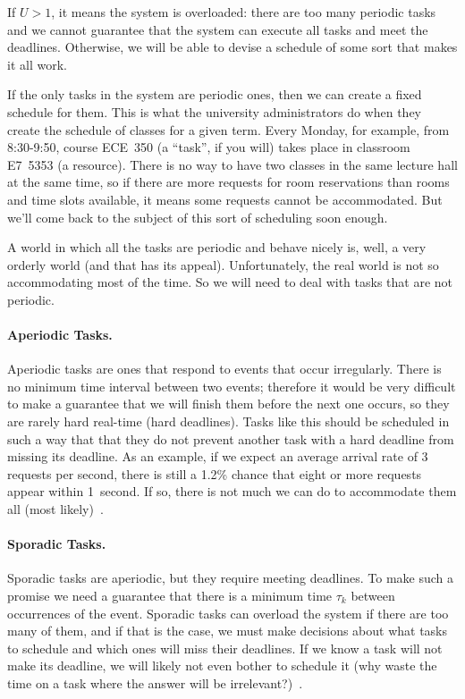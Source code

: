 If $U > 1$, it means the system is overloaded: there are too many periodic tasks and we cannot guarantee that the system can execute all tasks and meet the deadlines. Otherwise, we will be able to devise a schedule of some sort that makes it all work.

If the only tasks in the system are periodic ones, then we can create a fixed schedule for them. This is what the university administrators do when they create the schedule of classes for a given term. Every Monday, for example, from 8:30-9:50, course ECE~350 (a ``task'', if you will) takes place in classroom E7~5353 (a resource). There is no way to have two classes in the same lecture hall at the same time, so if there are more requests for room reservations than rooms and time slots available, it means some requests cannot be accommodated. But we'll come back to the subject of this sort of scheduling soon enough.

A world in which all the tasks are periodic and behave nicely is, well, a very orderly world (and that has its appeal). Unfortunately, the real world is not so accommodating most of the time. So we will need to deal with tasks that are not periodic.

\paragraph{Aperiodic Tasks.}
Aperiodic tasks are ones that respond to events that occur irregularly. There is no minimum time interval between two events; therefore it would be very difficult to make a guarantee that we will finish them before the next one occurs, so they are rarely hard real-time (hard deadlines). Tasks like this should be scheduled in such a way that that they do not prevent another task with a hard deadline from missing its deadline. As an example, if we expect an average arrival rate of 3 requests per second, there is still a 1.2\% chance that eight or more requests appear within 1~second. If so, there is not much we can do to accommodate them all (most likely)~\cite{mte241}.

\paragraph{Sporadic Tasks.}
Sporadic tasks are aperiodic, but they require meeting deadlines. To make such a promise we need a guarantee that there is a minimum time $\tau_{k}$ between occurrences of the event. Sporadic tasks can overload the system if there are too many of them, and if that is the case, we must make decisions about what tasks to schedule and which ones will miss their deadlines. If we know a task will not make its deadline, we will likely not even bother to schedule it (why waste the time on a task where the answer will be irrelevant?)~\cite{mte241}.

